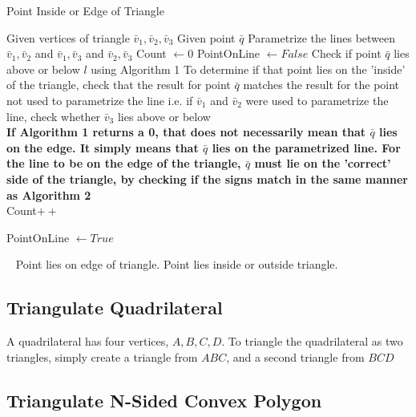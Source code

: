 \documentclass[a4paper,10pt]{scrartcl}
\begin{document}
\begin{algorithm}[h]
  \caption{Point Inside or Edge of Triangle}\label{}
  \begin{algorithmic}
    \State Given vertices of triangle $\bar v_1, \bar v_2, \bar v_3$
    \State Given point $\bar q$
    \State Parametrize the lines between $\bar v_1, \bar v_2$ and $\bar v_1, \bar v_3$ and $\bar v_2, \bar v_3$
    \State Count $\gets 0$
    \State PointOnLine $\gets False$
      \State Check if point $\bar q$ lies above or below $l$ using Algorithm 1
      \State To determine if that point lies on the 'inside' of the triangle, check that the result
      for point $\bar q$ matches the result for the point not used to parametrize the line i.e. if
      $\bar v_1$ and $\bar v_2$ were used to parametrize the line, check whether $\bar v_3$ lies above or below
      \\
      {\bfseries
      \State If Algorithm 1 returns a 0, that does not necessarily mean that $\bar q$ lies on the edge. It simply means
      that $\bar q$ lies on the parametrized line. For the line to be on the edge of the triangle,
      $\bar q$ must lie on the 'correct' side of the triangle, by checking if the signs match in the same manner
      as Algorithm 2}
      \\
	\State Count$++$
      \EndIf
      
	\State PointOnLine $\gets True$
      \EndIf
    \EndFor
    
    \
      \State Point lies on edge of triangle.
    \Else
      \State Point lies inside or outside triangle.
    \EndIf  
  \end{algorithmic}
\end{algorithm}

\newpage


\subsection{Triangulate Quadrilateral}

A quadrilateral has four vertices, $A, B, C, D$. To triangle the quadrilateral as two triangles, simply create
a triangle from $ABC$, and a second triangle from $BCD$

\subsection{Triangulate N-Sided Convex Polygon}
\end{document}
